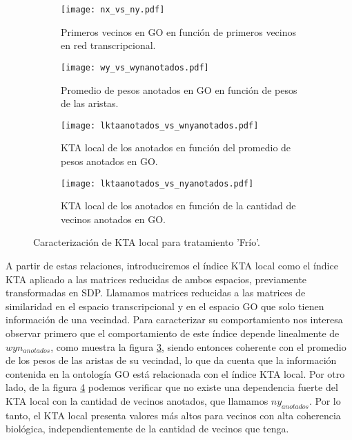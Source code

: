 \begin{sidewaysfigure}[t!]
    \centering
    \begin{subfigure}[t]{0.45\textwidth}
    \centering
    \texttt{[image: nx\_vs\_ny.pdf]}
    \caption{Primeros vecinos en GO en función de primeros vecinos en red transcripcional.}
    \label{fig:nx_vs_ny}
    \end{subfigure}    
    \begin{subfigure}[t]{0.45\textwidth}
    \centering
    \texttt{[image: wy\_vs\_wynanotados.pdf]}
    \caption{Promedio de pesos anotados en GO en función de pesos de las aristas.}
    \label{fig:wy_vs_wynanotados}
    \end{subfigure}    
    \begin{subfigure}[t]{0.45\textwidth}
    \centering
    \texttt{[image: lktaanotados\_vs\_wnyanotados.pdf]}
    \caption{KTA local de los anotados en función del promedio de pesos anotados en GO.}
    \label{fig:lktaanotados_vs_wnyanotados}
    \end{subfigure}    
    \begin{subfigure}[t]{0.45\textwidth}
    \centering
    \texttt{[image: lktaanotados\_vs\_nyanotados.pdf]}
    \caption{KTA local de los anotados en función de la cantidad de vecinos anotados en GO.}
    \label{fig:lktaanotados_vs_nyanotados}
    \end{subfigure}            
    \label{fig:ktalocal}
    \caption{Caracterización de KTA local para tratamiento 'Frío'.}
\end{sidewaysfigure}
A partir de estas relaciones, introduciremos el índice KTA local como el índice KTA aplicado a las matrices reducidas de ambos espacios, previamente transformadas en SDP. Llamamos matrices reducidas a las matrices de similaridad en el espacio transcripcional y en el espacio GO que solo tienen información de una vecindad. Para caracterizar su comportamiento nos interesa observar primero que el comportamiento de este índice depende linealmente de $wyn_{anotados}$, como muestra la figura \ref{fig:lktaanotados_vs_wnyanotados}, siendo entonces coherente con el promedio de los pesos de las aristas de su vecindad, lo que da cuenta que la información contenida en la ontología GO está relacionada con el índice KTA local. Por otro lado, de la figura \ref{fig:lktaanotados_vs_nyanotados} podemos verificar que no existe una dependencia fuerte del KTA local con la cantidad de vecinos anotados, que llamamos $ny_{anotados}$. Por lo tanto, el KTA local presenta valores más altos para vecinos con alta coherencia biológica, independientemente de la cantidad de vecinos que tenga.
